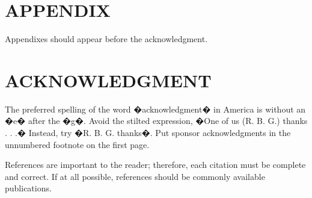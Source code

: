 \documentclass[letterpaper, 10 pt, conference]{ieeeconf}  %
\begin{document}






\section*{APPENDIX}

Appendixes should appear before the acknowledgment.

\section*{ACKNOWLEDGMENT}

The preferred spelling of the word �acknowledgment� in America is without an �e� after the �g�. Avoid the stilted expression, �One of us (R. B. G.) thanks . . .�  Instead, try �R. B. G. thanks�. Put sponsor acknowledgments in the unnumbered footnote on the first page.




References are important to the reader; therefore, each citation must be complete and correct. If at all possible, references should be commonly available publications.
\end{document}
